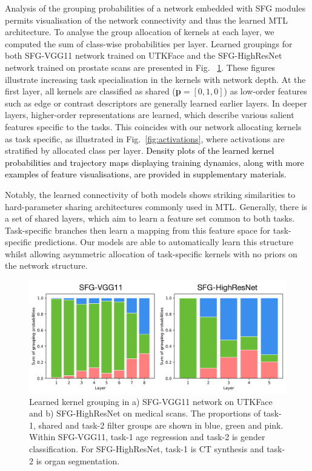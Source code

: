 Analysis of the grouping probabilities of a network embedded with SFG modules permits visualisation of the network connectivity and thus the learned MTL architecture. To analyse the group allocation of kernels at each layer, we computed the sum of class-wise probabilities per layer. Learned groupings for both SFG-VGG11 network trained on UTKFace and the SFG-HighResNet network trained on prostate scans are presented in Fig.~ \ref{fig:LEARNED_A}. These figures illustrate increasing task specialisation in the kernels with network depth. At the first layer, all kernels are classified as shared (\textbf{p}$=[0, 1, 0]$) as low-order features such as edge or contrast descriptors are generally learned earlier layers. In deeper layers, higher-order representations are learned, which describe various salient features specific to the tasks. This coincides with our network allocating kernels as task specific, as illustrated in Fig.~\ref{fig:activations}, where activations are stratified by allocated class per layer. \textcolor{black}{Density plots of the learned kernel probabilities and trajectory maps displaying training dynamics, along with more examples of feature visualisations, are provided in supplementary materials.}

Notably, the learned connectivity of both models shows striking similarities to hard-parameter sharing architectures commonly used in MTL. Generally, there is a set of shared layers, which aim to learn a feature set common to both tasks. Task-specific branches then learn a mapping from this feature space for task-specific predictions. Our models are able to automatically learn this structure whilst allowing asymmetric allocation of task-specific kernels with no priors on the network structure.

\begin{figure}[ht]
	\center
	\vspace{-3mm}
	\includegraphics[width=1.0\linewidth]{chapter_6/figures/learned_a.pdf}
	\caption{\small Learned kernel grouping in a) SFG-VGG11 network on UTKFace and b) SFG-HighResNet on medical scans. The proportions of task-1, shared and task-2 filter groups are shown in blue, green and pink. Within SFG-VGG11, task-1 age regression and task-2 is gender classification. For SFG-HighResNet, task-1 is CT synthesis and task-2 is organ segmentation. }
	\vspace{-3mm}
    \label{fig:LEARNED_A}
\end{figure}


